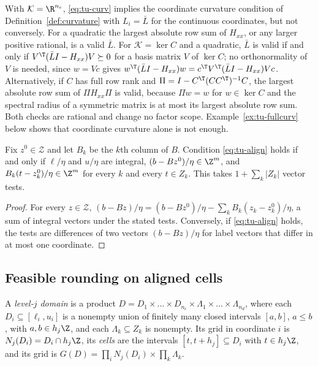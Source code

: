 \begin{remark}\label{rem:tu-curv}
With $\mathcal K=\R^{n_c}$, \eqref{eq:tu-curv} implies the coordinate
curvature condition of Definition~\ref{def:curvature} with $L_i=\bar L$ for the
continuous coordinates, but not conversely. For a quadratic the largest
absolute row sum of $H_{xx}$, or any larger positive rational, is a valid
$\bar L$. For $\mathcal K=\ker C$ and a quadratic, $\bar L$ is valid if and
only if $V^{\T}(\bar LI-H_{xx})V\succeq0$ for a basis matrix $V$ of $\ker C$;
no orthonormality of $V$ is needed, since $w=Vc$ gives
$w^{\T}(\bar LI-H_{xx})w=c^{\T}V^{\T}(\bar LI-H_{xx})Vc$.
Alternatively, if $C$ has full row rank and
$\Pi=I-C^{\T}(CC^{\T})^{-1}C$, the largest absolute row sum of
$\Pi H_{xx}\Pi$ is valid, because $\Pi w=w$ for $w\in\ker C$ and the spectral
radius of a symmetric matrix is at most its largest absolute row sum. Both
checks are rational and change no factor scope. Example~\ref{ex:tu-fullcurv}
below shows that coordinate curvature alone is not enough.
\end{remark}

\begin{proposition}\label{prop:tu-align}
Fix $z^0\in\mathcal Z$ and let $B_k$ be the $k$th column of $B$. Condition
\eqref{eq:tu-align} holds if and only if $\ell/\eta$ and $u/\eta$ are integral,
$(b-Bz^0)/\eta\in\Z^m$, and $B_k(t-z^0_k)/\eta\in\Z^m$ for every $k$ and
every $t\in Z_k$. This takes $1+\sum_k\lvert Z_k\rvert$ vector tests.
\end{proposition}

\begin{proof}
For every $z\in\mathcal Z$,
$(b-Bz)/\eta=(b-Bz^0)/\eta-\sum_kB_k(z_k-z^0_k)/\eta$, a sum of integral
vectors under the stated tests. Conversely, if \eqref{eq:tu-align} holds, the
tests are differences of two vectors $(b-Bz)/\eta$ for label vectors that
differ in at most one coordinate.
\end{proof}

\subsection{Feasible rounding on aligned cells}\label{sec:tu-rounding}

\begin{definition}\label{def:tu-domain}
A \emph{level-$j$ domain} is a product
$D=D_1\times\dots\times D_{n_c}\times\Lambda_1\times\dots\times\Lambda_{n_d}$,
where each $D_i\subseteq[\ell_i,u_i]$ is a nonempty union of finitely many
closed intervals $[a,b]$, $a\le b$, with $a,b\in h_j\Z$, and each
$\Lambda_k\subseteq Z_k$ is nonempty. Its grid in coordinate $i$ is
$N_j(D_i)=D_i\cap h_j\Z$, its \emph{cells} are the intervals
$[t,t+h_j]\subseteq D_i$ with $t\in h_j\Z$, and its grid is
$G(D)=\prod_iN_j(D_i)\times\prod_k\Lambda_k$.
\end{definition}


